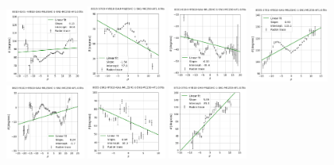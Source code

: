 \documentclass[fleqn,usenatbib]{mnras}
\begin{document}
\begin{figure}
    \includegraphics[width=0.23\textwidth]{Images/LINFITS/CPSB-8313-6101-LINFIT-EBARS-MASKED.png}
    \includegraphics[width=0.23\textwidth]{Images/LINFITS/CPSB-8315-3703-LINFIT-EBARS-MASKED.png}
    \includegraphics[width=0.23\textwidth]{Images/LINFITS/CPSB-8331-6104-LINFIT-EBARS-MASKED.png}
    \includegraphics[width=0.23\textwidth]{Images/LINFITS/CPSB-8555-3701-LINFIT-EBARS-MASKED.png}
    \includegraphics[width=0.23\textwidth]{Images/LINFITS/CPSB-8623-9102-LINFIT-EBARS-MASKED.png}
    \includegraphics[width=0.23\textwidth]{Images/LINFITS/CPSB-8655-1902-LINFIT-EBARS-MASKED.png}
    \includegraphics[width=0.23\textwidth]{Images/LINFITS/CPSB-8713-3701-LINFIT-EBARS-MASKED.png}

\end{figure}
\end{document}
